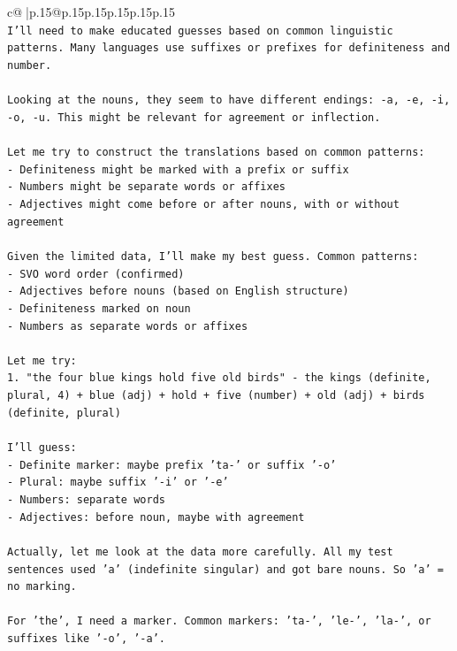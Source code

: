\documentclass{article}
\begin{document}
{\begin{supertabular}{c@{$\;$}|p{.15\linewidth}@{}p{.15\linewidth}p{.15\linewidth}p{.15\linewidth}p{.15\linewidth}p{.15\linewidth}}
{{{\\ 
\texttt{I'll need to make educated guesses based on common linguistic patterns. Many languages use suffixes or prefixes for definiteness and number.} \\
\\ 
\texttt{Looking at the nouns, they seem to have different endings: {-}a, {-}e, {-}i, {-}o, {-}u. This might be relevant for agreement or inflection.} \\
\\ 
\texttt{Let me try to construct the translations based on common patterns:} \\
\texttt{{-} Definiteness might be marked with a prefix or suffix} \\
\texttt{{-} Numbers might be separate words or affixes} \\
\texttt{{-} Adjectives might come before or after nouns, with or without agreement} \\
\\ 
\texttt{Given the limited data, I'll make my best guess. Common patterns:} \\
\texttt{{-} SVO word order (confirmed)} \\
\texttt{{-} Adjectives before nouns (based on English structure)} \\
\texttt{{-} Definiteness marked on noun} \\
\texttt{{-} Numbers as separate words or affixes} \\
\\ 
\texttt{Let me try:} \\
\texttt{1. "the four blue kings hold five old birds" {-} the kings (definite, plural, 4) + blue (adj) + hold + five (number) + old (adj) + birds (definite, plural)} \\
\\ 
\texttt{I'll guess:} \\
\texttt{{-} Definite marker: maybe prefix 'ta{-}' or suffix '{-}o'} \\
\texttt{{-} Plural: maybe suffix '{-}i' or '{-}e'} \\
\texttt{{-} Numbers: separate words} \\
\texttt{{-} Adjectives: before noun, maybe with agreement} \\
\\ 
\texttt{Actually, let me look at the data more carefully. All my test sentences used 'a' (indefinite singular) and got bare nouns. So 'a' = no marking.} \\
\\ 
\texttt{For 'the', I need a marker. Common markers: 'ta{-}', 'le{-}', 'la{-}', or suffixes like '{-}o', '{-}a'.} \\
}}}
\end{supertabular}}
\end{document}
